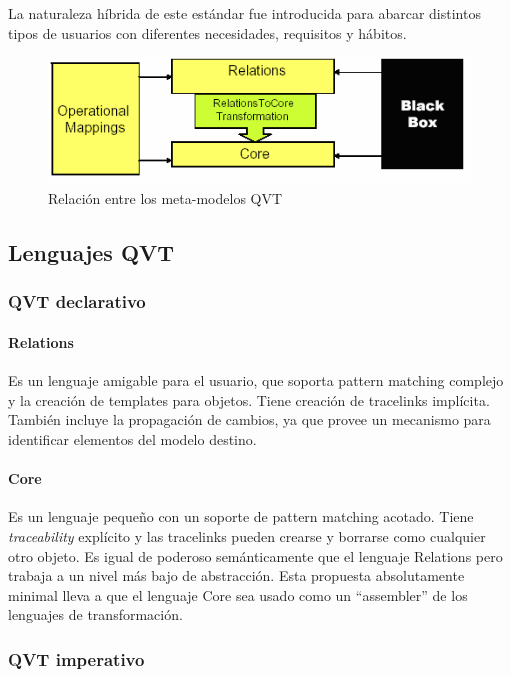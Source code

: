 \documentclass[a4paper,12pt,oneside,spanish]{book}
\begin{document}
La naturaleza híbrida de este estándar fue introducida para abarcar distintos tipos de usuarios con diferentes necesidades, requisitos y hábitos.


\begin{figure}[hbtp]
\centering
\includegraphics[scale=.65]{./img/metamodelosQVT}
\caption{Relación entre los meta-modelos QVT}
\label{QVTmetamodelos}
\end{figure}


\subsection{Lenguajes QVT}


\subsubsection{QVT declarativo}


\paragraph{Relations}

Es un lenguaje amigable para el usuario, que soporta pattern matching complejo y la creación de templates para objetos. Tiene creación de tracelinks implícita. También incluye la propagación de cambios, ya que provee un mecanismo para identificar elementos del modelo destino. 

\paragraph{Core}

Es un lenguaje pequeño con un soporte de pattern matching acotado. Tiene \textit{traceability} explícito y las tracelinks pueden crearse y borrarse como cualquier otro objeto. Es igual de poderoso semánticamente que el lenguaje Relations pero trabaja a un nivel más bajo de abstracción. Esta propuesta absolutamente minimal lleva a que el lenguaje Core sea usado como un “assembler” de los lenguajes de transformación.


\subsubsection{QVT imperativo}
\end{document}
